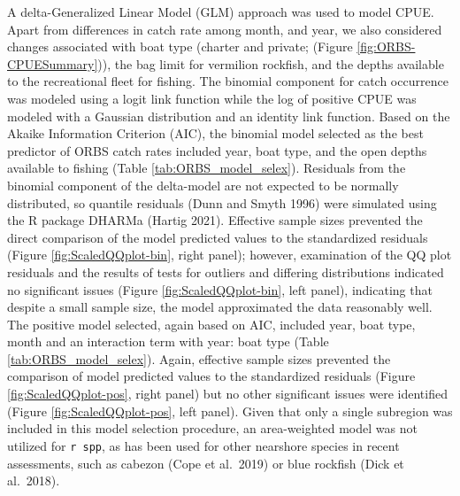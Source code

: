 \documentclass[11pt,
  english,
  a4paper,
]{article}
\begin{document}
A delta-Generalized Linear Model (GLM) approach was used to model CPUE. Apart from differences in catch rate among month, and year, we also considered changes associated with boat type (charter and private; (Figure \ref{fig:ORBS-CPUESummary})), the bag limit for vermilion rockfish, and the depths available to the recreational fleet for fishing. The binomial component for catch occurrence was modeled using a logit link function while the log of positive CPUE was modeled with a Gaussian distribution and an identity link function. Based on the Akaike Information Criterion (AIC), the binomial model selected as the best predictor of ORBS catch rates included year, boat type, and the open depths available to fishing (Table \ref{tab:ORBS_model_selex}). Residuals from the binomial component of the delta-model are not expected to be normally distributed, so quantile residuals (Dunn and Smyth 1996) were simulated using the R package DHARMa (Hartig 2021). Effective sample sizes prevented the direct comparison of the model predicted values to the standardized residuals (Figure \ref{fig:ScaledQQplot-bin}, right panel); however, examination of the QQ plot residuals and the results of tests for outliers and differing distributions indicated no significant issues (Figure \ref{fig:ScaledQQplot-bin}, left panel), indicating that despite a small sample size, the model approximated the data reasonably well. The positive model selected, again based on AIC, included year, boat type, month and an interaction term with year: boat type (Table \ref{tab:ORBS_model_selex}). Again, effective sample sizes prevented the comparison of model predicted values to the standardized residuals (Figure \ref{fig:ScaledQQplot-pos}, right panel) but no other significant issues were identified (Figure \ref{fig:ScaledQQplot-pos}, left panel). Given that only a single subregion was included in this model selection procedure, an area-weighted model was not utilized for \texttt{r\ spp}, as has been used for other nearshore species in recent assessments, such as cabezon (Cope et al.~2019) or blue rockfish (Dick et al.~2018).

\leavevmode\tagmcend\tagstructend\par

\end{document}
